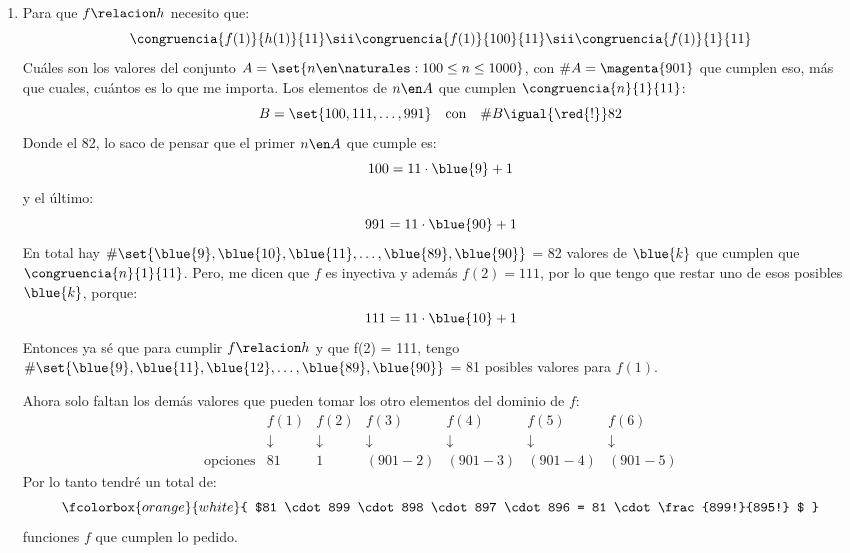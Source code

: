 \begin{enumerate}[label=\alph*)]
	\item
	      Para que $f \relacion h$ necesito que:
	      $$
		      \congruencia{f(1)}{h(1)}{11}
		      \sii
		      \congruencia{f(1)}{100}{11}
		      \sii
		      \congruencia{f(1)}{1}{11}
	      $$
	      Cuáles son los valores del conjunto $A = \set{n \en \naturales :  100 \leq n \leq 1000}$, con $\#A = \magenta{901}$ que cumplen eso, más que cuales,
	      cuántos es lo que me importa. Los elementos de $n \en A$ que cumplen $\congruencia{n}{1}{11}$:
	      $$
		      B = \set{100, 111, \dots, 991} \quad\text{con} \quad \#B \igual{\red{!}} 82
	      $$
	      Donde el 82, lo saco de pensar que el primer $n \en A$ que cumple es:
	      $$
		      100 = 11 \cdot \blue{9} + 1
	      $$
	      y el último:
	      $$
		      991 = 11 \cdot \blue{90} + 1
	      $$
          En total hay $\#\set{\blue{9},\blue{10},\blue{11},\dots,\blue{89},\blue{90}}$ = 82 valores de $\blue{k}$ que cumplen que $\congruencia{n}{1}{11}$. Pero, me dicen que $f$ es inyectiva y además
	      $f(2) = 111$, por lo que tengo que restar uno de esos posibles $\blue{k}$, porque:
	      $$
		      111 = 11 \cdot \blue{10} + 1
	      $$
          Entonces ya sé que para cumplir $f \relacion h$ y que f(2) = 111, tengo $\#\set{\blue{9},\blue{11}, \blue{12},\dots,\blue{89},\blue{90}}$ = 81 
          posibles valores para $f(1)$.

          Ahora solo
	      faltan los demás valores que pueden tomar los otro elementos del dominio de $f$:
	      $$
		      \begin{array}{ccccccc}
			                      & f(1)       & f(2)       & f(3)       & f(4)       & f(5)       & f(6)       \\
			                      & \downarrow & \downarrow & \downarrow & \downarrow & \downarrow & \downarrow \\
			      \text{opciones} & 81         & 1          & (901 - 2)  & (901 - 3)  & (901 - 4)  & (901 - 5)
		      \end{array}
	      $$
	      Por lo tanto tendré un total de:
	      $$
		      \fcolorbox{orange}{white}{
			      $81 \cdot 899 \cdot 898 \cdot 897 \cdot 896 =  81 \cdot \frac{899!}{895!} $
		      }
	      $$
	      funciones $f$ que cumplen lo pedido.
\end{enumerate}

\begin{aportes}
	\item {}
\end{aportes}

